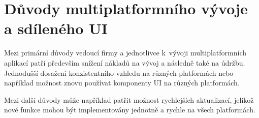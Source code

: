 \section{Důvody multiplatformního vývoje a sdíleného UI}

Mezi primární důvody vedoucí firmy a jednotlivce k~vývoji multiplatformních aplikací patří především
snížení nákladů na vývoj a následně také na údržbu. Jednodušší dosažení konzistentního vzhledu
na různých platformách nebo například možnost znovu používat komponenty UI na různých platformách.

Mezi další důvody může například patřit možnost rychlejších aktualizací, jelikož nové funkce mohou být 
implementovány jednotně a rychle na všech platformách. 